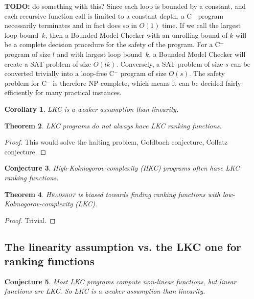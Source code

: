 \documentclass[preprint]{sigplanconf}
\newtheorem{theorem}{Theorem}
\newtheorem{corollary}[theorem]{Corollary}
\newtheorem{conjecture}[theorem]{Conjecture}
\theoremstyle{definition}
\newcommand{\todo}[1]{{\bf TODO:} #1}
\newcommand{\newC}{C$^-$\xspace}
\begin{document}
\todo{do something with this?}
Since each loop is bounded by a constant, and each recursive function call is
limited to a constant depth, a \newC program necessarily terminates and in
fact does so in $O(1)$ time.  If we call the largest loop bound~$k$, then
a Bounded Model Checker with an unrolling bound of $k$ will be a complete
decision procedure for the safety of the program.  For a \newC program of
size $l$ and with largest loop bound~$k$, a Bounded Model Checker will
create a SAT problem of size $O(lk)$.  Conversely, a SAT problem
of size $s$ can be converted trivially into a loop-free \newC program
of size $O(s)$.  The safety problem for \newC is therefore NP-complete,
which means it can be decided fairly efficiently for many practical
instances.


\iffalse
\begin{corollary}
 LKC is a weaker assumption than linearity.
\end{corollary}


\begin{theorem}
 LKC programs do not always have LKC ranking functions.
\end{theorem}

\begin{proof}
 This would solve the halting problem, Goldbach conjecture, Collatz conjecture.
\end{proof}

\begin{conjecture}
 High-Kolmogorov-complexity (HKC) programs often have LKC ranking functions.
\end{conjecture}

\begin{theorem}
 \textsc{Headshot} is biased towards finding ranking functions with
 low-Kolmogorov-complexity (LKC).
\end{theorem}

\begin{proof}
 Trivial.
\end{proof}

\subsection{The linearity assumption vs. the LKC one for ranking functions}

\begin{conjecture}
 Most LKC programs compute non-linear functions, but linear functions are LKC.
 So LKC is a weaker assumption than linearity.
\end{conjecture}
\end{document}
